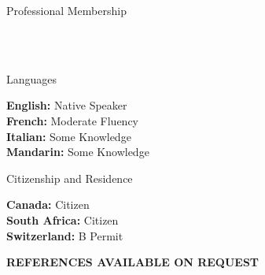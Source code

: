 \documentclass{cv}
\begin{document}

\begin{rSection}{Professional Membership}

 \\
 \\

\end{rSection}


\begin{rSection}{Languages}

{\bf English:} Native Speaker \vspace{0.2em}\\
{\bf French:} Moderate Fluency \vspace{0.2em}\\
{\bf Italian:} Some Knowledge \vspace{0.2em}\\
{\bf Mandarin:} Some Knowledge

\end{rSection}


\begin{rSection}{Citizenship and Residence}

{\bf Canada:} Citizen \vspace{0.2em}\\
{\bf South Africa:} Citizen \vspace{0.2em}\\
{\bf Switzerland:} B Permit

\end{rSection}


\vfill
\begin{center}
    \large{\MakeUppercase{\bf References Available On Request}}
\end{center}
\end{document}
